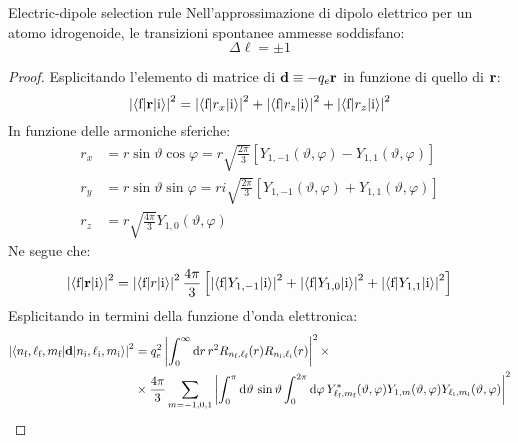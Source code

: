 \begin{theorem}{Electric-dipole selection rule}{}
	Nell'approssimazione di dipolo elettrico per un atomo idrogenoide, le transizioni spontanee ammesse soddisfano:
	\begin{equation}
		\Delta \ell = \pm 1
	\end{equation}

	\tcblower
	
	\begin{proof}
		Esplicitando l'elemento di matrice di $ \mathbf{d} \equiv -q_e \mathbf{r} $ in funzione di quello di $ \mathbf{r} $:
		\begin{equation*}
			\left\lvert\braket{\text{f} | \mathbf{r} | \text{i}}\right\rvert^2 = \left\lvert\braket{\text{f} | r_x | \text{i}}\right\rvert^2 + \left\lvert\braket{\text{f} | r_z | \text{i}}\right\rvert^2 + \left\lvert\braket{\text{f} | r_z | \text{i}}\right\rvert^2
		\end{equation*}
		In funzione delle armoniche sferiche:
		\begin{align*}
			r_x &= r \sin \vartheta \cos \varphi = r \sqrt{\frac{2\pi}{3}} \left[ Y_{1,-1}(\vartheta, \varphi) - Y_{1,1}(\vartheta, \varphi) \right] \\
			r_y &= r \sin \vartheta \sin \varphi = r i \sqrt{\frac{2\pi}{3}} \left[ Y_{1,-1}(\vartheta, \varphi) + Y_{1,1}(\vartheta, \varphi) \right] \\
			r_z &= r \sqrt{\frac{4\pi}{3}} Y_{1,0}(\vartheta, \varphi)
		\end{align*}
		Ne segue che:
		\begin{equation*}
			\left\lvert\braket{\text{f} | \mathbf{r} | \text{i}}\right\rvert^2 = \left\lvert\braket{\text{f} | r | \text{i}}\right\rvert^2 \frac{4\pi}{3} \left[ \left\lvert\braket{\text{f} | Y_{1,-1} | \text{i}}\right\rvert^2 + \left\lvert\braket{\text{f} | Y_{1,0} | \text{i}}\right\rvert^2 + \left\lvert\braket{\text{f} | Y_{1,1} | \text{i}}\right\rvert^2 \right]
		\end{equation*}
		Esplicitando in termini della funzione d'onda elettronica:
		\begin{equation*}
			\begin{split}
				\abs{\braket{n_\text{f} , \ell_\text{f} , m_\text{f} | \ve{d} | n_\text{i} , \ell_\text{i} , m_\text{i}}}^2
				& = q_e^2 \abs{\int_0^\infty \dd r\, r^2 R_{n_\text{f} , \ell_\text{f}}(r) R_{n_\text{i} , \ell_\text{i}}(r)}^2 \times \\
				& \times \frac{4\pi}{3} \sum_{m = -1,0,1} \abs{\int_0^\pi \dd \vartheta \, \sin \vartheta \int_0^{2\pi} \dd \varphi \, Y_{\ell_\text{f} , m_\text{f}}^*(\vartheta,\varphi) Y_{1,m}(\vartheta,\varphi) Y_{\ell_\text{i} , m_\text{i}}(\vartheta,\varphi)}^2
			\end{split}

\end{equation*}
\end{proof}
\end{theorem}
